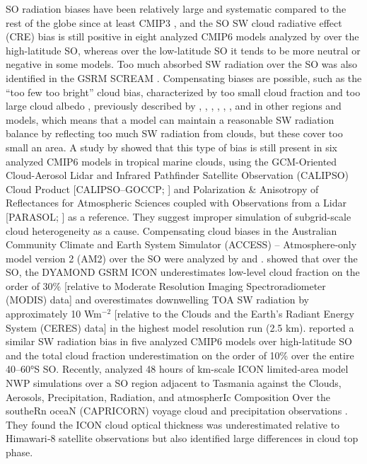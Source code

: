 \documentclass[draft]{agujournal2019}
\begin{document}
SO radiation biases have been relatively large and systematic compared to the rest of the globe since at least CMIP3 , and the SO SW cloud radiative effect (CRE) bias is still positive in eight analyzed CMIP6 models analyzed by  over the high-latitude SO, whereas over the low-latitude SO it tends to be more neutral or negative in some models. Too much absorbed SW radiation over the SO was also identified in the GSRM SCREAM . Compensating biases are possible, such as the ``too few too bright'' cloud bias, characterized by too small cloud fraction and too large cloud albedo , previously described by , , , , , , and  in other regions and models, which means that a model can maintain a reasonable SW radiation balance by reflecting too much SW radiation from clouds, but these cover too small an area. A study by  showed that this type of bias is still present in six analyzed CMIP6 models in tropical marine clouds, using the GCM-Oriented Cloud-Aerosol Lidar and Infrared Pathfinder Satellite Observation (CALIPSO) Cloud Product [CALIPSO--GOCCP; ] and Polarization \& Anisotropy of Reflectances for Atmospheric Sciences coupled with Observations from a Lidar [PARASOL; ] as a reference. They suggest improper simulation of subgrid-scale cloud heterogeneity as a cause. Compensating cloud biases in the Australian Community Climate and Earth System Simulator (ACCESS) – Atmosphere-only model version 2 (AM2) over the SO were analyzed by  and .  showed that over the SO, the DYAMOND GSRM ICON underestimates low-level cloud fraction on the order of 30\% [relative to Moderate Resolution Imaging Spectroradiometer (MODIS) data] and overestimates downwelling TOA SW radiation by approximately 10 Wm$^\mathrm{-2}$ [relative to the Clouds and the Earth’s Radiant Energy System (CERES) data] in the highest model resolution run (2.5 km).  reported a similar SW radiation bias in five analyzed CMIP6 models over high-latitude SO and the total cloud fraction underestimation on the order of 10\% over the entire 40--60°S SO. Recently,  analyzed 48 hours of km-scale ICON limited-area model NWP simulations over a SO region adjacent to Tasmania against the Clouds, Aerosols, Precipitation, Radiation, and atmospherIc Composition Over the southeRn oceaN (CAPRICORN) voyage cloud and precipitation observations . They found the ICON cloud optical thickness was underestimated relative to Himawari‐8 satellite observations but also identified large differences in cloud top phase.
\end{document}
